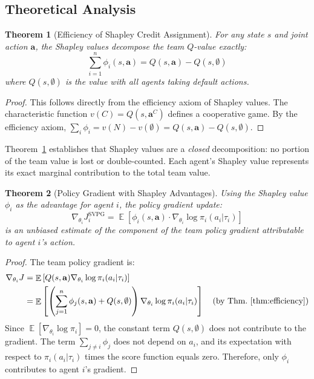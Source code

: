 \documentclass[11pt,a4paper]{article}
\newtheorem{theorem}{Theorem}[section]
\DeclareMathOperator*{\E}{\mathbb{E}}
\begin{document}
\subsection{Theoretical Analysis}

\begin{theorem}[Efficiency of Shapley Credit Assignment]
\label{thm:efficiency}
For any state $s$ and joint action $\mathbf{a}$, the Shapley values decompose the team $Q$-value exactly:
$$\sum_{i=1}^n \phi_i(s, \mathbf{a}) = Q(s, \mathbf{a}) - Q(s, \emptyset)$$
where $Q(s,\emptyset)$ is the value with all agents taking default actions.
\end{theorem}

\begin{proof}
This follows directly from the efficiency axiom of Shapley values. The characteristic function $v(C) = Q(s, \mathbf{a}^C)$ defines a cooperative game. By the efficiency axiom, $\sum_i \phi_i = v(N) - v(\emptyset) = Q(s,\mathbf{a}) - Q(s,\emptyset)$.
\end{proof}

Theorem~\ref{thm:efficiency} establishes that Shapley values are a \emph{closed} decomposition: no portion of the team value is lost or double-counted. Each agent's Shapley value represents its exact marginal contribution to the total team value.

\begin{theorem}[Policy Gradient with Shapley Advantages]
\label{thm:pg}
Using the Shapley value $\phi_i$ as the advantage for agent $i$, the policy gradient update:
$$\nabla_{\theta_i} J_i^{\text{SVPG}} = \E\left[ \phi_i(s,\mathbf{a}) \cdot \nabla_{\theta_i} \log \pi_i(a_i|\tau_i) \right]$$
is an unbiased estimate of the component of the team policy gradient attributable to agent $i$'s action.
\end{theorem}

\begin{proof}
The team policy gradient is:
\begin{align}
\nabla_{\theta_i} J &= \E\left[ Q(s,\mathbf{a}) \nabla_{\theta_i} \log \pi_i(a_i|\tau_i) \right] \\
&= \E\left[ \left(\sum_{j=1}^n \phi_j(s,\mathbf{a}) + Q(s,\emptyset)\right) \nabla_{\theta_i} \log \pi_i(a_i|\tau_i) \right] \quad \text{(by Thm.~\ref{thm:efficiency})}
\end{align}
Since $\E[\nabla_{\theta_i} \log \pi_i] = 0$, the constant term $Q(s,\emptyset)$ does not contribute to the gradient. The term $\sum_{j \neq i} \phi_j$ does not depend on $a_i$, and its expectation with respect to $\pi_i(a_i|\tau_i)$ times the score function equals zero. Therefore, only $\phi_i$ contributes to agent $i$'s gradient.
\end{proof}
\end{document}
